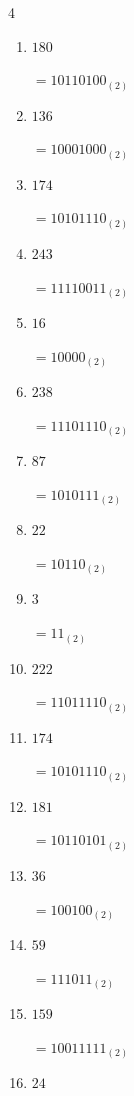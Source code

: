 \begin{multicols}{4}
\begin{enumerate}
        $=11000101_{(2)}$

  \item $180$

        $=10110100_{(2)}$

  \item $136$

        $=10001000_{(2)}$

  \item $174$

        $=10101110_{(2)}$

  \item $243$

        $=11110011_{(2)}$

  \item $16$

        $=10000_{(2)}$

  \item $238$

        $=11101110_{(2)}$

  \item $87$

        $=1010111_{(2)}$

  \item $22$

        $=10110_{(2)}$

  \item $3$

        $=11_{(2)}$

\columnbreak %

\resetques

  \item $222$

        $=11011110_{(2)}$

  \item $174$

        $=10101110_{(2)}$

  \item $181$

        $=10110101_{(2)}$

  \item $36$

        $=100100_{(2)}$

  \item $59$

        $=111011_{(2)}$

  \item $159$

        $=10011111_{(2)}$

  \item $24$


\end{enumerate}
\end{multicols}
